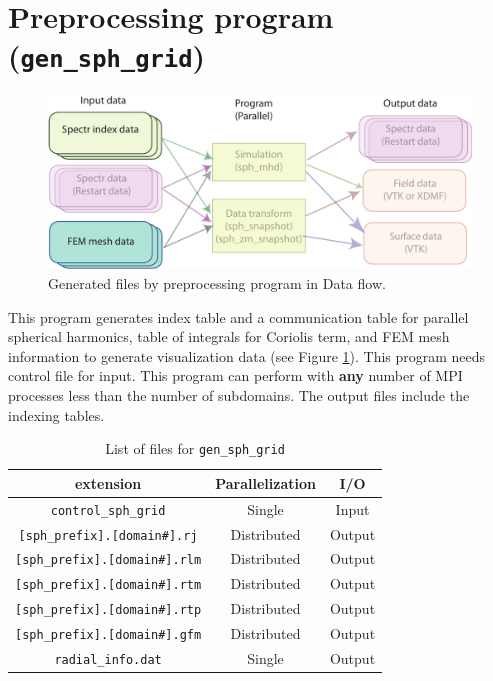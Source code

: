 \section{Preprocessing program ({\tt gen\_sph\_grid})}
\label{section:gen_sph_grid}
%
\begin{figure}[htbp]
\begin{center}
\includegraphics*[width=130mm]{images/flow_1}
\end{center}
\caption{Generated files by preprocessing program in Data flow.}
\label{fig:gen_sph_grid}
\end{figure}
%
This program generates index table and a communication table for parallel spherical harmonics, table of integrals for Coriolis term, and FEM mesh information to generate visualization data (see Figure \ref{fig:gen_sph_grid}). This program needs control file for input. This program can perform with {\bf any} number of MPI processes less than the number of subdomains. The output files include the indexing tables. 

%
\begin{table}[htp]
\caption{List of files for {\tt gen\_sph\_grid} }
\begin{center} 
\begin{tabular}{|c|c|c|}
\hline
 extension & Parallelization & I/O \\ \hline \hline
\verb|control_sph_grid| & Single & Input \\ \hline
\verb|[sph_prefix].[domain#].rj|  & Distributed & Output \\
\verb|[sph_prefix].[domain#].rlm| & Distributed & Output \\
\verb|[sph_prefix].[domain#].rtm| & Distributed & Output \\
\verb|[sph_prefix].[domain#].rtp| & Distributed & Output \\ \hline
\verb|[sph_prefix].[domain#].gfm| & Distributed & Output \\
\verb|radial_info.dat| & Single & Output \\ \hline
\end{tabular}
\end{center}
\label{table:gen_sph_grid}
\end{table}
%

